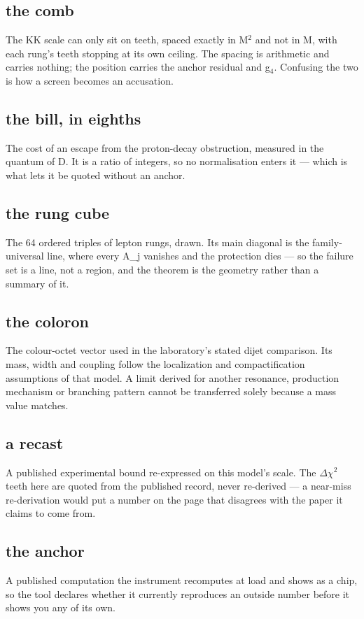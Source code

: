 \documentclass[11pt,a4paper]{article}
\begin{document}
\subsection*{the comb}
The KK scale can only sit on teeth, spaced exactly in M\ensuremath{{}^{2}} and not in M, with each rung's teeth stopping at its own ceiling. The spacing is arithmetic and carries nothing; the position carries the anchor residual and g\ensuremath{{}_{4}}. Confusing the two is how a screen becomes an accusation.

\subsection*{the bill, in eighths}
The cost of an escape from the proton-decay obstruction, measured in the quantum of D. It is a ratio of integers, so no normalisation enters it --- which is what lets it be quoted without an anchor.

\subsection*{the rung cube}
The 64 ordered triples of lepton rungs, drawn. Its main diagonal is the family-universal line, where every A\_j vanishes and the protection dies --- so the failure set is a line, not a region, and the theorem is the geometry rather than a summary of it.

\subsection*{the coloron}
The colour-octet vector used in the laboratory's stated dijet comparison. Its mass, width and coupling follow the localization and compactification assumptions of that model. A limit derived for another resonance, production mechanism or branching pattern cannot be transferred solely because a mass value matches.

\subsection*{a recast}
A published experimental bound re-expressed on this model's scale. The \ensuremath{\Delta}\ensuremath{\chi}\ensuremath{{}^{2}} teeth here are quoted from the published record, never re-derived --- a near-miss re-derivation would put a number on the page that disagrees with the paper it claims to come from.

\subsection*{the anchor}
A published computation the instrument recomputes at load and shows as a chip, so the tool declares whether it currently reproduces an outside number before it shows you any of its own.
\end{document}
